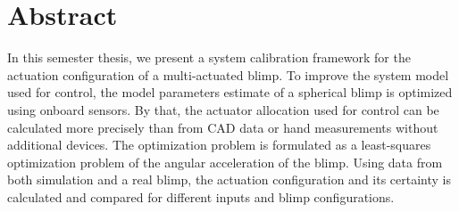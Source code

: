 \chapter*{Abstract}

In this semester thesis, we present a system calibration framework for the actuation configuration of a multi-actuated blimp.
To improve the system model used for control, the model parameters estimate of a spherical blimp is optimized using onboard sensors.
By that, the actuator allocation used for control can be calculated more precisely than from CAD data or hand measurements without additional devices.
The optimization problem is formulated as a least-squares optimization problem of the angular acceleration of the blimp.
Using data from both simulation and a real blimp, the actuation configuration and its certainty is calculated and compared for different inputs and blimp configurations.

